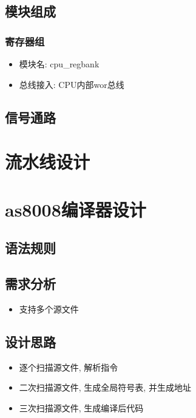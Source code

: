 \documentclass[10pt]{book}
\begin{document}
\section{模块组成}
\subsection{寄存器组}
\begin{itemize}
  \item 模块名: cpu\_regbank
  \item 总线接入: CPU内部wor总线
\end{itemize}

\section{信号通路}

\chapter{流水线设计}


\chapter{as8008编译器设计}
\section{语法规则}

\section{需求分析}
\begin{itemize}
  \item 支持多个源文件
\end{itemize}

\section{设计思路}
\begin{itemize}
  \item 逐个扫描源文件, 解析指令
  \item 二次扫描源文件, 生成全局符号表, 并生成地址
  \item 三次扫描源文件, 生成编译后代码
\end{itemize}
\end{document}

